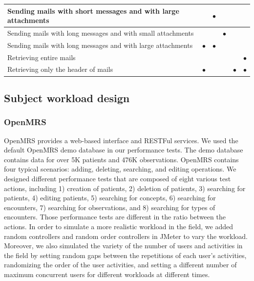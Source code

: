 \begin{table}[htbp]
\begin{tabular}{|m{16em}<{\centering}|m{4em}<{\centering}|m{4em}<{\centering}|m{4em}<{\centering}|m{4em}<{\centering}|m{4em}<{\centering}|}
    \hline
    Sending mails with short messages and with large attachments &       & $\bullet$   &       &       &  \\
    \hline
    Sending mails with long messages and with small attachments &       &       & $\bullet$   &       &  \\
    \hline
    Sending mails with long messages and with large attachments & $\bullet$   & $\bullet$   &       &       &  \\
    \hline
    Retrieving entire mails &       &       &       &       & $\bullet$ \\
    \hline
    Retrieving only the header of mails & $\bullet$   &       &       & $\bullet$   & $\bullet$ \\
    \hline
    \end{tabular}%
  \label{tab:workload_difference}%
\end{table}%



\subsection{Subject workload design}
\subsubsection{OpenMRS}
OpenMRS provides a web-based interface and RESTFul services. We used the default OpenMRS demo database in our performance tests. The demo database contains data for over 5K patients and 476K observations. OpenMRS contains four typical scenarios: adding, deleting, searching, and editing operations. We designed different performance tests that are composed of eight various test actions, including 1) creation of patients, 2) deletion of patients, 3) searching for patients, 4) editing patients, 5) searching for concepts, 6) searching for encounters, 7) searching for observations, and 8) searching for types of encounters.
Those performance tests are different in the ratio between the actions. 
In order to simulate a more realistic workload in the field, we added random controllers and random order controllers in JMeter to vary the workload. Moreover, we also simulated the variety of the number of users and activities in the field by setting random gaps between the repetitions of each user’s activities, randomizing the order of the user activities, and setting a different number of maximum concurrent users for different workloads at different times.

